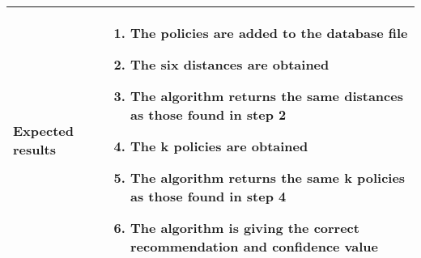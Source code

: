 \begin{center}
\begin{longtable}{ | p{4cm} | p{10cm} | }
			Expected results &	\begin{enumerate}
							\item The policies are added to the database file
							\item The six distances are obtained
							\item The algorithm returns the same distances as those found in step 2
							\item The k policies are obtained
							\item The algorithm returns the same k policies as those found in step 4
							\item The algorithm is giving the correct recommendation and confidence value
						\end{enumerate}
							 \\  [3pt] \hline
	\end{longtable}
\end{center}

